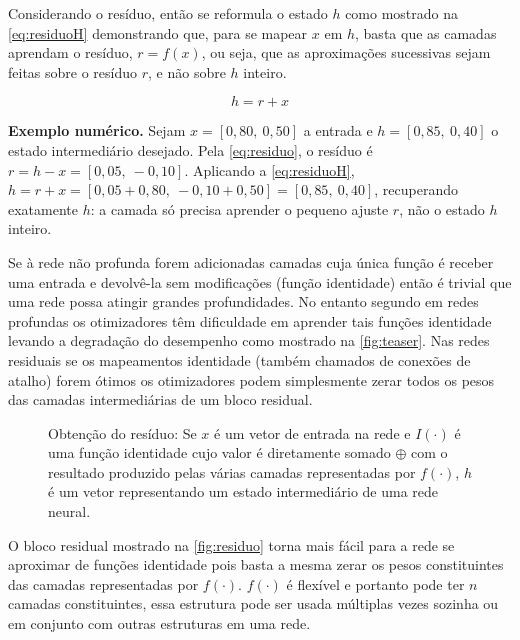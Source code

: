 				\par Considerando o resíduo, então se  reformula o estado $h$ como mostrado na \autoref{eq:residuoH} demonstrando que, para se mapear $x$ em $h$, basta que as camadas aprendam o resíduo, $r = f(x)$, ou seja, que as aproximações sucessivas sejam feitas sobre o resíduo $r$, e não sobre $h$ inteiro.
				
				\begin{equation}
					\label{eq:residuoH}
					h = r + x
				\end{equation}
				\par \textbf{Exemplo numérico.} Sejam $x=[0{,}80,\ 0{,}50]$ a entrada e $h=[0{,}85,\ 0{,}40]$ o estado intermediário desejado. Pela \autoref{eq:residuo}, o resíduo é $r = h-x = [0{,}05,\ -0{,}10]$. Aplicando a \autoref{eq:residuoH}, $h = r+x = [0{,}05+0{,}80,\ -0{,}10+0{,}50] = [0{,}85,\ 0{,}40]$, recuperando exatamente $h$: a camada só precisa aprender o pequeno ajuste $r$, não o estado $h$ inteiro.
			
				\par Se à rede não profunda forem adicionadas camadas cuja única função é receber uma entrada e devolvê-la sem modificações (função identidade) então é trivial que uma rede possa atingir grandes profundidades. No entanto segundo  em redes profundas os otimizadores têm dificuldade em aprender tais funções identidade levando a degradação do desempenho como mostrado na \autoref{fig:teaser}. Nas redes residuais se os mapeamentos identidade (também chamados de conexões de atalho) forem ótimos os otimizadores podem simplesmente zerar todos os pesos das camadas intermediárias de um bloco residual.
				

				\begin{figure}[h]
					\centering
					\caption[Obtenção do resíduo]{Obtenção do resíduo: Se $x$ é um vetor de entrada na rede e  $I(\cdot)$ é uma função identidade cujo valor é diretamente somado $\oplus$ com o resultado produzido pelas várias camadas representadas por $f(\cdot)$, $h$ é um vetor representando um estado intermediário de uma rede neural.}
					
					\label{fig:residuo}
				\end{figure}
			
				\par O bloco residual mostrado na \autoref{fig:residuo} torna mais fácil para a rede se aproximar de funções identidade pois basta a mesma zerar os pesos constituintes das camadas representadas por $f(\cdot)$. $f(\cdot)$ é flexível e portanto pode ter $n$ camadas constituintes, essa estrutura pode ser usada múltiplas vezes sozinha ou em conjunto com outras estruturas em uma rede.
				
